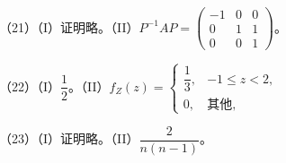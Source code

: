\documentclass[UTF8,12pt]{ctexart}
\begin{document}
（21）（I）证明略。（II）\(\displaystyle P^{-1}AP=\begin{pmatrix}-1&0&0\\0&1&1\\0&0&1\end{pmatrix}\)。


（22）（I）\(\displaystyle \dfrac{\displaystyle 1}{\displaystyle 2}\)。（II）\(\displaystyle f_Z(z)=\begin{cases}\dfrac{\displaystyle 1}{\displaystyle 3},\allowbreak &-1\le z<2,\allowbreak \\0,\allowbreak &\text{其他},\allowbreak \end{cases}\)


（23）（I）证明略。（II）\(\displaystyle \dfrac{\displaystyle 2}{\displaystyle n(n-1)}\)。
\end{document}
